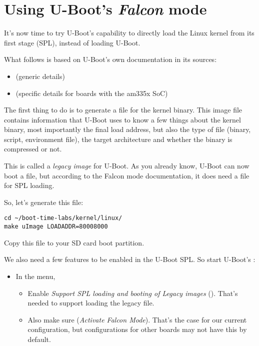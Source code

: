 \section{Using U-Boot's {\em Falcon} mode}

It's now time to try U-Boot's capability to directly load the
Linux kernel from its first stage (SPL), instead of loading U-Boot.

What follows is based on U-Boot's own documentation in its sources:
\begin{itemize}
\item {} (generic details)
\item {} (specific details for boards with
      the am335x SoC)
\end{itemize}

The first thing to do is to generate a  file for the kernel
binary. This image file contains information that U-Boot uses to know a
few things about the kernel binary, most importantly the final load
address, but also the type of file (binary, script, environment file),
the target architecture and whether the binary is compressed or not.

This is called a {\em legacy image} for U-Boot. As you already know,
U-Boot can now boot a  file, but according to the Falcon
mode documentation, it does need a  file for SPL loading.

So, let's generate this file:
\begin{verbatim}
cd ~/boot-time-labs/kernel/linux/
make uImage LOADADDR=80008000
\end{verbatim}

Copy this  file to your SD card boot partition.

We also need a few features to be enabled in the U-Boot SPL. So start
U-Boot's :
\begin{itemize}
\item In the  menu,
      \begin{itemize}
      \item Enable {\em Support SPL loading and booting of Legacy images}
	    ().
            That's needed to support loading the legacy  file.
      \item Also make sure 
            ({\em Activate Falcon Mode}).
            That's the case for our current configuration, but configurations
            for other boards may not have this by default.
      \end{itemize}
\end{itemize}

